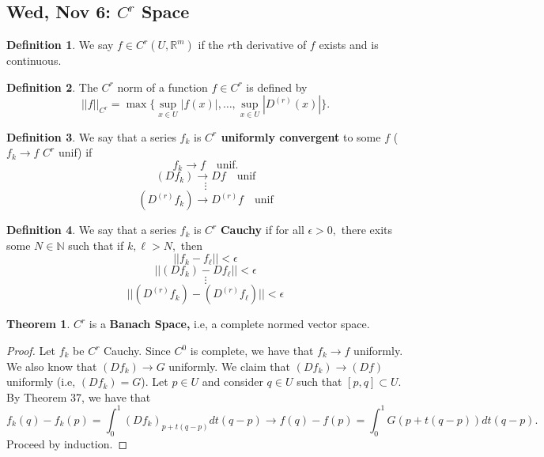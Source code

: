 \documentclass[10pt, oneside]{article}
\newcommand{\bbR}{\mathbb{R}}
\newcommand{\bbN}{\mathbb{N}}
\theoremstyle{definition}
\newtheorem{thm}{Theorem}
\newtheorem{defn}{Definition}
\begin{document}
\subsection{Wed, Nov 6: $C^r$ Space}
\begin{defn}
    We say $f\in C^r(U, \bbR^m)$ if the $r$th derivative of $f$ exists and is continuous. 
\end{defn}
\begin{defn}
    The $C^r$ norm of a function $f\in C^r$ is defined by 
    \[||f||_{C^r} = \max\{\sup_{x\in U}|f(x)|, \dots, \sup_{x\in U}|D^{(r)}(x)|\}.\]
\end{defn}
\begin{defn}
    We say that a series $f_k$ is \textbf{$C^r$ uniformly convergent} to some $f$ ($f_k \to f$ $C^r$ unif) if
    \[f_k \to f \quad \text{unif.}\]
    \[(Df_k) \to Df \quad \text{unif}\]
    \[\vdots\]
    \[(D^{(r)}f_k) \to D^{(r)}f \quad \text{unif}\]
\end{defn}
\begin{defn}
We say that a series $f_k$ is $C^r$ \textbf{Cauchy} if for all $\epsilon>0,$ there exits some $N \in \bbN$ such that if $k, \ell >N,$ then
\[||f_k - f_{\ell}||< \epsilon\]
\[||(Df_k) - Df_{\ell}||< \epsilon\]
\[\vdots\]
\[||(D^{(r)}f_k) - (D^{(r)}f_\ell)||< \epsilon\]
\end{defn}
\begin{thm}
    $C^r$ is a \textbf{Banach Space,} i.e, a complete normed vector space. 
\end{thm}
\begin{proof}
    Let $f_k$ be $C^r$ Cauchy. Since $C^0$ is complete, we have that $f_k \to f$ uniformly. We also know that $(Df_k)\to G$ uniformly. We claim that $(Df_k)\to (Df)$ uniformly (i.e, $(Df_k) = G$). Let $p \in U$ and consider $q\in U$ such that $[p,q]\subset U.$ By Theorem 37, we have that 
    \[f_k(q) - f_k(p) = \int_0^1(Df_k)_{p + t(q-p)}dt (q-p)\to f(q) - f(p) = \int_0^1 G(p + t(q-p))dt (q-p).\] Proceed by induction.
\end{proof}

\newpage
\end{document}
